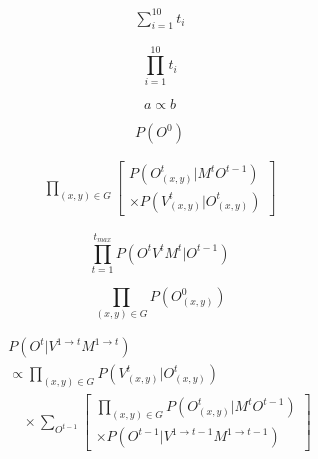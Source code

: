\documentclass[12pt]{article}
\begin{document}
\begin{equation*}
\begin{split}
\sum
	_{i=1}
	^{10}
	{ t_i }
\end{split}
\end{equation*}

\begin{equation}
\prod
	_{i=1}
	^{10}
	{ t_i }
\end{equation}

\begin{equation}
a \propto b
\end{equation}

\begin{equation}
P(O^{0})
\end{equation}

\begin{equation}
\begin{aligned}
\prod
	_{(x,y) \in G}
	\left[
		\begin{array}{l}
		 P(O_{(x,y)}^{t}|M^{t} O^{t-1}) \\
		\times 
		P(V_{(x,y)}^{t} | O_{(x,y)}^{t}) 
		\end{array}
	\right]
\end{aligned}
\end{equation}

\begin{equation}
\prod
	_{ t=1}
	 ^{t_{max}}
	 {
		P(O^{t}V^{t}M^{t}|O^{t-1})
	}
\end{equation}


\begin{equation}
\prod
	_{(x,y) \in G} 
	{
		 P(O_{(x,y)}^{0})
	}
\end{equation}

\begin{equation}
\begin{array}{l}
\left.
P(O^{t} | V^{1\rightarrow t}M^{1\rightarrow t}) 
\right. \\
\left.
 \propto
\displaystyle\prod
	_{(x,y) \in G}
	{ 	 
		P (V_{(x,y)}^{t} | O_{(x,y)}^{t} )
	 } 
\right. \\
\quad\times	
\displaystyle\sum
	_{O^{t-1}}
	\left[
		\begin{array}{l}
		\displaystyle\prod_{(x,y) \in G} {  P (O_{(x,y)}^{t} | M^{t} O^{t-1} ) }  \\ 
		\times 
		P(O^{t-1} | V^{1\rightarrow t-1}M^{1\rightarrow t-1})
		\end{array}
	\right]
\end{array}
\end{equation}
\end{document}
